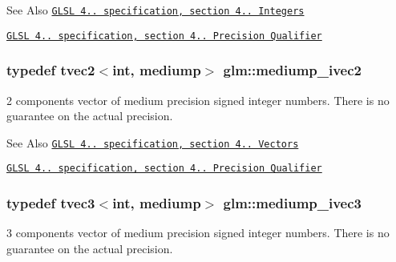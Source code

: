 \begin{DoxySeeAlso}{See Also}
\href{http://www.opengl.org/registry/doc/GLSLangSpec.4.20.8.pdf}{\tt G\-L\-S\-L 4.. specification, section 4.. Integers} 

\href{http://www.opengl.org/registry/doc/GLSLangSpec.4.20.8.pdf}{\tt G\-L\-S\-L 4.. specification, section 4.. Precision Qualifier} 
\end{DoxySeeAlso}
\hypertarget{group__core__precision_ga38b24c06ac0dfe4dcfbe7abf9a93dbb4}{
\subsubsection[{mediump\-\_\-ivec2}]{\setlength{\rightskip}{0pt plus 5cm}typedef tvec2$<$int, mediump$>$ {\bf glm\-::mediump\-\_\-ivec2}}}\label{group__core__precision_ga38b24c06ac0dfe4dcfbe7abf9a93dbb4}
2 components vector of medium precision signed integer numbers. There is no guarantee on the actual precision.

\begin{DoxySeeAlso}{See Also}
\href{http://www.opengl.org/registry/doc/GLSLangSpec.4.20.8.pdf}{\tt G\-L\-S\-L 4.. specification, section 4.. Vectors} 

\href{http://www.opengl.org/registry/doc/GLSLangSpec.4.20.8.pdf}{\tt G\-L\-S\-L 4.. specification, section 4.. Precision Qualifier} 
\end{DoxySeeAlso}
\hypertarget{group__core__precision_ga16a38c6077c2e83375ee258cd95e224b}{
\subsubsection[{mediump\-\_\-ivec3}]{\setlength{\rightskip}{0pt plus 5cm}typedef tvec3$<$int, mediump$>$ {\bf glm\-::mediump\-\_\-ivec3}}}\label{group__core__precision_ga16a38c6077c2e83375ee258cd95e224b}
3 components vector of medium precision signed integer numbers. There is no guarantee on the actual precision.

